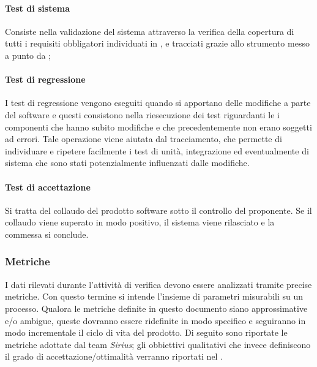 \paragraph{Test di sistema}
Consiste nella validazione del sistema attraverso la verifica della copertura di tutti i requisiti obbligatori individuati in \infoAR, e tracciati  grazie allo strumento messo a punto da \gruppo;
\paragraph{Test di regressione}
I test di regressione vengono eseguiti quando si apportano delle modifiche a parte del software e questi consistono nella riesecuzione dei test riguardanti le i componenti che hanno subito modifiche e che precedentemente non erano soggetti ad errori.
Tale operazione viene aiutata dal tracciamento, che permette di individuare e ripetere facilmente i test di unità, integrazione ed eventualmente di sistema che sono stati potenzialmente influenzati dalle modifiche.
\paragraph{Test di accettazione}
Si tratta del collaudo del prodotto software sotto il controllo del proponente. Se il collaudo viene superato in modo positivo, il sistema viene rilasciato e la commessa si conclude.

\subsubsection{Metriche}
I dati rilevati durante l'attività di verifica devono essere analizzati tramite precise metriche.
Con questo termine si intende l'insieme di parametri misurabili su un processo. Qualora le metriche definite in questo documento siano approssimative e/o ambigue, queste dovranno essere ridefinite in modo specifico e seguiranno in modo incrementale il ciclo di vita del prodotto. Di seguito sono riportate le metriche adottate dal team \textit{Sirius}; gli obbiettivi qualitativi che invece definiscono il grado di accettazione/ottimalità verranno riportati nel \PianoDiQualifica.
